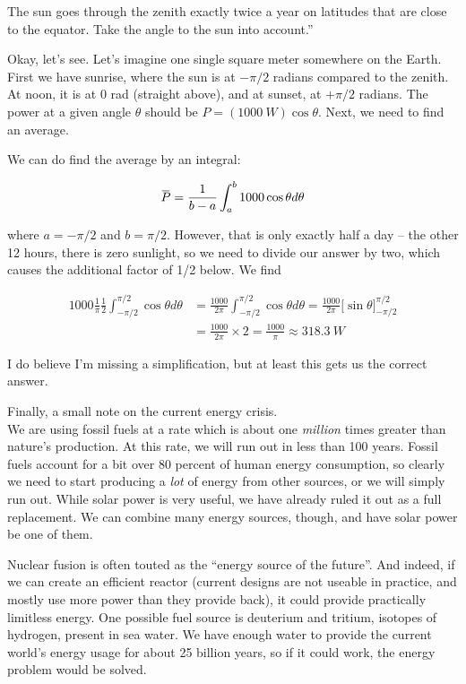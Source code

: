 \documentclass[12pt,a4paper]{report}
\newcommand{\overbar}[1]{\mkern 1.5mu\overline{\mkern-1.5mu#1\mkern-1.5mu}\mkern 1.5mu}
\begin{document}
The sun goes through the zenith exactly twice a year on latitudes that are close to the equator. Take the angle to the sun into account.''

Okay, let's see. Let's imagine one single square meter somewhere on the Earth. First we have sunrise, where the sun is at $-\pi/2$ radians compared to the zenith. At noon, it is at 0 rad (straight above), and at sunset, at $+\pi/2$ radians. The power at a given angle $\theta$ should be $P = (\SI{1000}{W})\cos\theta$. Next, we need to find an average.

We can do find the average by an integral:

\begin{equation}
\overbar{P} = \frac{1}{b - a} \int_a^b 1000 \cos \theta d \theta
\end{equation}

where $a = -\pi/2$ and $b = \pi/2$. However, that is only exactly half a day -- the other 12 hours, there is zero sunlight, so we need to divide our answer by two, which causes the additional factor of 1/2 below. We find

\begin{align}
1000 \frac{1}{\pi} \frac{1}{2} \int_{-\pi/2}^{\pi/2} \cos \theta d \theta &= \frac{1000}{2 \pi} \int_{-\pi/2}^{\pi/2} \cos \theta d \theta = \frac{1000}{2\pi} \Big[ \sin \theta \Big]_{-\pi/2}^{\pi/2}\\
                                                              &= \frac{1000}{2\pi} \times 2 = \frac{1000}{\pi} \approx \SI{318.3}{W}
\end{align}

I do believe I'm missing a simplification, but at least this gets us the correct answer.

Finally, a small note on the current energy crisis.\\
We are using fossil fuels at a rate which is about one \emph{million} times greater than nature's production. At this rate, we will run out in less than 100 years. Fossil fuels account for a bit over 80 percent of human energy consumption, so clearly we need to start producing a \emph{lot} of energy from other sources, or we will simply run out. While solar power is very useful, we have already ruled it out as a full replacement. We can combine many energy sources, though, and have solar power be one of them.

Nuclear fusion is often touted as the ``energy source of the future''. And indeed, if we can create an efficient reactor (current designs are not useable in practice, and mostly use more power than they provide back), it could provide practically limitless energy. One possible fuel source is deuterium and tritium, isotopes of hydrogen, present in sea water. We have enough water to provide the current world's energy usage for about 25 billion years, so if it could work, the energy problem would be solved.
\end{document}
